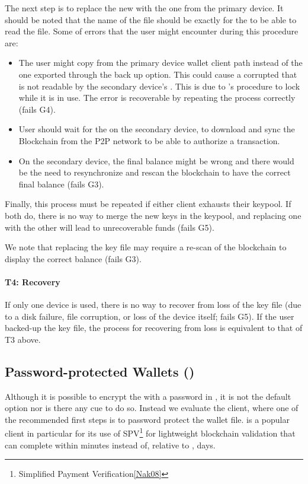 The next step is to replace the new \walletfile with the one from the primary device. It should be noted that the name of the file should be exactly \walletfile for the \Bitcoinclient to be able to read the file. Some of errors that the user might encounter during this procedure are:
\begin{itemize}
	\item The user might copy \walletfile from the primary device wallet client path instead of the one exported through the back up option. This could cause a corrupted \walletfile that is not readable by the secondary device's \Bitcoinclient. This is due to \Bitcoinclient's procedure to lock \walletfile while it is in use. The error is recoverable by repeating the process correctly (fails G4). 
	\item User should wait for the \Bitcoinclient on the secondary device, to download and sync the Blockchain from the P2P network to be able to authorize a transaction.
	\item On the secondary device, the final balance might be wrong and there would be the need to resynchronize and rescan the blockchain to have the correct final balance (fails G3).
\end{itemize}

Finally, this process must be repeated if either client exhausts their keypool. If both do, there is no way to merge the new keys in the keypool, and replacing one \walletfile with the other will lead to unrecoverable funds (fails G5). 

We note that replacing the key file may require  a re-scan of the blockchain to display the correct balance (fails G3).

\paragraph{T4: Recovery} If only one device is used, there is no way to recover from loss of the key file (\eg due to a disk failure, file corruption, or loss of the device itself; fails G5). If the user backed-up the key file, the process for recovering from loss is equivalent to that of T3 above. 


\subsection{Password-protected Wallets (\multibit)}
Although it is possible to encrypt the \walletfile with a password in \Bitcoinclient, it is not the default option nor is there any cue to do so. Instead we evaluate the \multibit client, where one of the recommended first steps is to password protect the wallet file. \multibit is a popular client in particular for its use of SPV\footnote{Simplified Payment Verification\ref{Nak08}} for lightweight blockchain validation that can complete within minutes instead of, relative to \Bitcoinclient, days.

